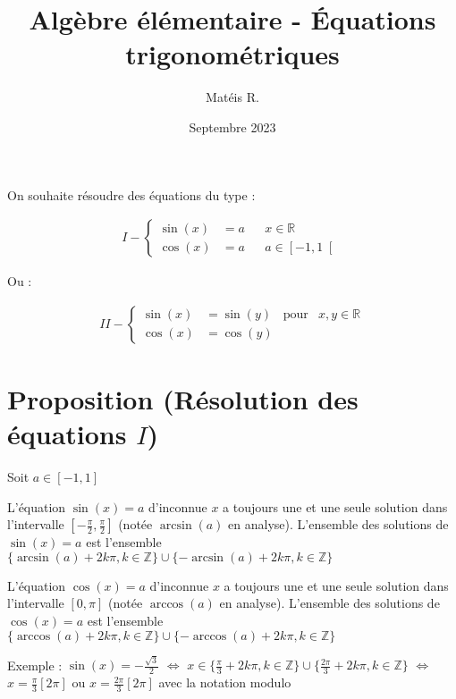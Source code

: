 \documentclass{article}
\title{Algèbre élémentaire - Équations trigonométriques}
\author{Matéis R.}
\date{Septembre 2023}
\begin{document}
\maketitle

On souhaite résoudre des équations du type :

\begin{equation*}
\begin{aligned}
I - \begin{cases}
\sin(x) &= a & & x\in \mathbb{R} \\
\cos(x) &= a & & a \in \left[ -1, 1 \right[
\end{cases}
\end{aligned}
\end{equation*}

Ou :

\begin{equation*}
\begin{aligned}
II - \begin{cases}
\sin(x) &= \sin(y) & \text{pour} & x, y \in \mathbb{R} \\
\cos(x) &= \cos(y) &
\end{cases}
\end{aligned}
\end{equation*}

\section{Proposition (Résolution des équations $I$)}

Soit $a \in \left[-1, 1 \right]$

L'équation $\sin(x) = a$ d'inconnue $x$ a toujours une et une seule solution dans l'intervalle $\left[-\frac{\pi}{2}, \frac{\pi}{2}\right]$ (notée $\arcsin(a)$ en analyse). L'ensemble des solutions de $\sin(x) = a$ est l'ensemble $\{ \arcsin(a) + 2k\pi, k \in \mathbb{Z} \} \cup \{ -\arcsin(a) + 2k\pi, k \in \mathbb{Z} \}$

L'équation $\cos(x) = a$ d'inconnue $x$ a toujours une et une seule solution dans l'intervalle $\left[0, \pi \right]$ (notée $\arccos(a)$ en analyse). L'ensemble des solutions de $\cos(x) = a$ est l'ensemble $\{ \arccos(a) + 2k\pi, k \in \mathbb{Z} \} \cup \{ -\arccos(a) + 2k\pi, k \in \mathbb{Z} \}$

Exemple : 
$\sin(x) = -\frac{\sqrt{3}}{2}$ 
$\iff$ $x \in \{ \frac{\pi}{3} + 2k\pi, k \in \mathbb{Z} \} \cup \{\frac{2\pi}{3} + 2k\pi, k \in \mathbb{Z} \}$
$\iff$ $x=\frac{\pi}{3} [ 2\pi ]$ ou $x=\frac{2\pi}{3} [ 2\pi ]$ avec la notation modulo
\end{document}
